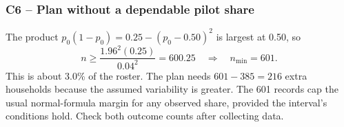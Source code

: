 	\subsubsection*{C6 -- Plan without a dependable pilot share}

	The product $p_0(1-p_0)=0.25-(p_0-0.50)^2$ is largest at 0.50, so
	\[
	n\ge\frac{1.96^2(0.25)}{0.04^2}=600.25\quad\Longrightarrow\quad n_{\min}=601.
	\]
	This is about 3.0\% of the roster. The plan needs $601-385=216$ extra households because the assumed variability is greater. The 601 records cap the usual normal-formula margin for any observed share, provided the interval's conditions hold. Check both outcome counts after collecting data.




